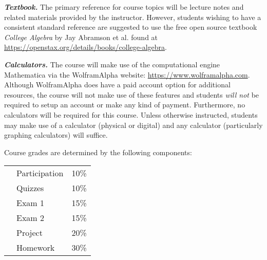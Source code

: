 \documentclass[11pt,letterpaper]{article}
\begin{document}
{\itshape\bfseries\color{stacred}Textbook.} The primary reference for course topics will be lecture notes and related materials provided by the instructor. However, students wishing to have a consistent standard reference are suggested to use the free open source textbook \textit{College Algebra} by Jay Abramson et al. found at \url{https://openstax.org/details/books/college-algebra}. \pspace

{\itshape\bfseries\color{stacred}Calculators.} The course will make use of the computational engine Mathematica via the WolframAlpha website: \url{https://www.wolframalpha.com}. Although WolframAlpha does have a paid account option for additional resources, the course will not make use of these features and students {\itshape will not} be required to setup an account or make any kind of payment. Furthermore, no calculators will be required for this course. Unless otherwise instructed, students may make use of a calculator (physical or digital) and any calculator (particularly graphing calculators) will suffice. 
\sectionbreak









Course grades are determined by the following components: \par
	\begin{table}[!ht]
        \begin{tabular}{clr}
	& Participation & 10\% \\
	& Quizzes & 10\% \\
	& Exam 1 & 15\% \\
	& Exam 2 & 15\% \\
	& Project & 20\% \\
	& Homework & 30\% \\
        \end{tabular} 
        \end{table}
\sectionbreak
\end{document}

